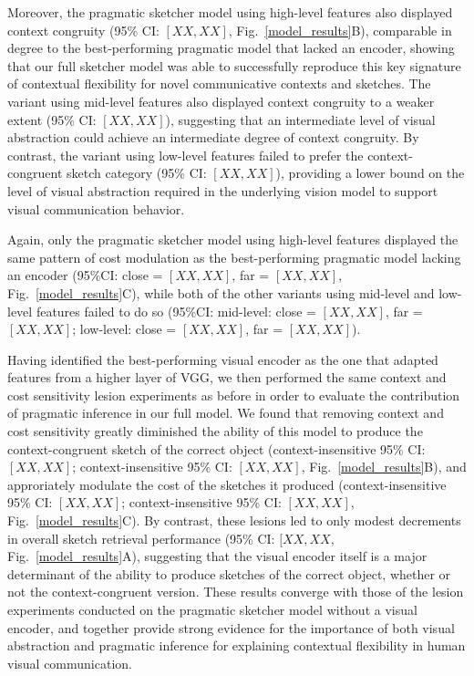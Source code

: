 \documentclass[9pt,twocolumn,twoside]{pnas-new}
\begin{document}
Moreover, the pragmatic sketcher model using high-level features also displayed context congruity (95\% CI: $[XX,XX]$, Fig.~\ref{model_results}B), comparable in degree to the best-performing pragmatic model that lacked an encoder, showing that our full sketcher model was able to successfully reproduce this key signature of contextual flexibility for novel communicative contexts and sketches. 
The variant using mid-level features also displayed context congruity to a weaker extent (95\% CI: $[XX,XX]$), suggesting that an intermediate level of visual abstraction could achieve an intermediate degree of context congruity. 
By contrast, the variant using low-level features failed to prefer the context-congruent sketch category (95\% CI: $[XX,XX]$), providing a lower bound on the level of visual abstraction required in the underlying vision model to support visual communication behavior. 

Again, only the pragmatic sketcher model using high-level features displayed the same pattern of cost modulation as the best-performing pragmatic model lacking an encoder (95\%CI: close = $[XX,XX]$, far = $[XX,XX]$, Fig.~\ref{model_results}C), while both of the other variants using mid-level and low-level features failed to do so (95\%CI: mid-level: close = $[XX,XX]$, far = $[XX,XX]$; low-level: close = $[XX,XX]$, far = $[XX,XX]$).  

Having identified the best-performing visual encoder as the one that adapted features from a higher layer of VGG, we then performed the same context and cost sensitivity lesion experiments as before in order to evaluate the contribution of pragmatic inference in our full model. 
We found that removing context and cost sensitivity greatly diminished the ability of this model to produce the context-congruent sketch of the correct object (context-insensitive 95\% CI: $[XX,XX]$; context-insensitive 95\% CI: $[XX,XX]$, Fig.~\ref{model_results}B), and approriately modulate the cost of the sketches it produced (context-insensitive 95\% CI: $[XX,XX]$; context-insensitive 95\% CI: $[XX,XX]$, Fig.~\ref{model_results}C). 
By contrast, these lesions led to only modest decrements in overall sketch retrieval performance (95\% CI: $[XX, XX$, Fig.~\ref{model_results}A), suggesting that the visual encoder itself is a major determinant of the ability to produce sketches of the correct object, whether or not the context-congruent version.
These results converge with those of the lesion experiments conducted on the pragmatic sketcher model without a visual encoder, and together provide strong evidence for the importance of both visual abstraction and pragmatic inference for explaining contextual flexibility in human visual communication. 
\end{document}
